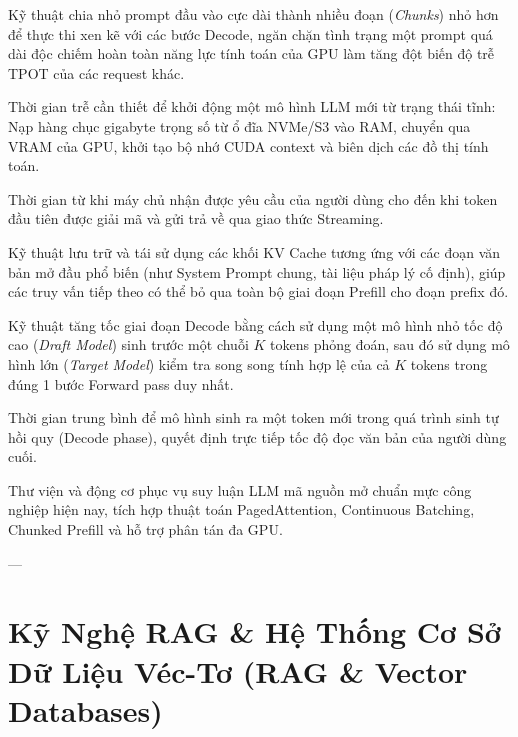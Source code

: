 \begin{description}[leftmargin=2.5cm, style=nextline]
  \item[\term{Chunked Prefill}] Kỹ thuật chia nhỏ prompt đầu vào cực dài thành nhiều đoạn (\textit{Chunks}) nhỏ hơn để thực thi xen kẽ với các bước Decode, ngăn chặn tình trạng một prompt quá dài độc chiếm hoàn toàn năng lực tính toán của GPU làm tăng đột biến độ trễ TPOT của các request khác.

  \item[\term{Cold Start Latency}] Thời gian trễ cần thiết để khởi động một mô hình LLM mới từ trạng thái tĩnh: Nạp hàng chục gigabyte trọng số từ ổ đĩa NVMe/S3 vào RAM, chuyển qua VRAM của GPU, khởi tạo bộ nhớ CUDA context và biên dịch các đồ thị tính toán.

  \item[\term{First Token Latency (TTFT)}] Thời gian từ khi máy chủ nhận được yêu cầu của người dùng cho đến khi token đầu tiên được giải mã và gửi trả về qua giao thức Streaming.

  \item[\term{Prefix Caching (Prompt Caching)}] Kỹ thuật lưu trữ và tái sử dụng các khối KV Cache tương ứng với các đoạn văn bản mở đầu phổ biến (như System Prompt chung, tài liệu pháp lý cố định), giúp các truy vấn tiếp theo có thể bỏ qua toàn bộ giai đoạn Prefill cho đoạn prefix đó.

  \item[\term{Speculative Decoding}] Kỹ thuật tăng tốc giai đoạn Decode bằng cách sử dụng một mô hình nhỏ tốc độ cao (\textit{Draft Model}) sinh trước một chuỗi $K$ tokens phỏng đoán, sau đó sử dụng mô hình lớn (\textit{Target Model}) kiểm tra song song tính hợp lệ của cả $K$ tokens trong đúng 1 bước Forward pass duy nhất.

  \item[\term{Token-to-Token Latency (TPOT)}] Thời gian trung bình để mô hình sinh ra một token mới trong quá trình sinh tự hồi quy (Decode phase), quyết định trực tiếp tốc độ đọc văn bản của người dùng cuối.

  \item[\term{vLLM}] Thư viện và động cơ phục vụ suy luận LLM mã nguồn mở chuẩn mực công nghiệp hiện nay, tích hợp thuật toán PagedAttention, Continuous Batching, Chunked Prefill và hỗ trợ phân tán đa GPU.
\end{description}

---

\section{Kỹ Nghệ RAG \& Hệ Thống Cơ Sở Dữ Liệu Véc-Tơ (RAG \& Vector Databases)}
\label{sec:app-glossary-rag}

